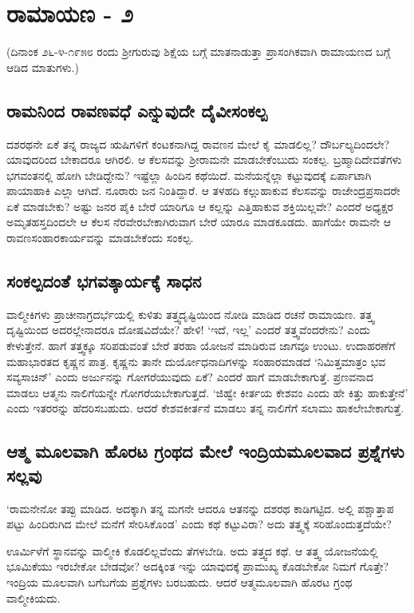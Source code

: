 \chapter{ರಾಮಾಯಣ - ೨}

(ದಿನಾಂಕ ೨೬-೪-೧೯೫೮ ರಂದು ಶ್ರೀಗುರುವು ಶಿಕ್ಷೆಯ ಬಗ್ಗೆ ಮಾತನಾಡುತ್ತಾ ಪ್ರಾಸಂಗಿಕವಾಗಿ ರಾಮಾಯಣದ ಬಗ್ಗೆ ಆಡಿದ ಮಾತುಗಳು.)

\section*{ರಾಮನಿಂದ ರಾವಣವಧೆ ಎನ್ನುವುದೇ ದೈವೀಸಂಕಲ್ಪ}

ದಶರಥನೇ ಏಕೆ ತನ್ನ ರಾಜ್ಯದ ಋಷಿಗಳಿಗೆ ಕಂಟಕನಾಗಿದ್ದ ರಾವಣನ ಮೇಲೆ ಕೈ ಮಾಡಲಿಲ್ಲ? ದೌರ್ಬಲ್ಯದಿಂದಲೇ? ಯಾವುದರಿಂದ ಬೇಕಾದರೂ ಆಗಿರಲಿ. ಆ ಕೆಲಸವನ್ನು  ಶ್ರೀರಾಮನೇ ಮಾಡಬೇಕೆಂಬುದು ಸಂಕಲ್ಪ. ಬ್ರಹ್ಮಾದಿದೇವತೆಗಳು ಭಗವಂತನಲ್ಲಿ ಹೋಗಿ ಬೇಡಿದ್ದೇನು? ಇಷ್ಟೆಲ್ಲಾ ಹಿಂದಿನ ಕಥೆಯಿದೆ. ಮನೆಯನ್ನೆಲ್ಲಾ ಕಟ್ಟುವುದಕ್ಕೆ ಏರ್ಪಾಟಾಗಿ ಪಾಯಾಹಾಕಿ ಎಲ್ಲಾ ಆಗಿದೆ. ನೂರಾರು ಜನ ನಿಂತಿದ್ದಾರೆ. ಆ ತಳಹದಿ ಕಲ್ಲುಹಾಕುವ ಕೆಲಸವನ್ನು ರಾಜೇಂದ್ರಪ್ರಸಾದರೇ ಏಕೆ ಮಾಡಬೇಕು? ಅಷ್ಟು ಜನರ ಪೈಕಿ ಬೇರೆ ಯಾರಿಗೂ ಆ ಕಲ್ಲನ್ನು ಎತ್ತಿಹಾಕುವ ಶಕ್ತಿಯಿಲ್ಲವೇ? ಎಂದರೆ ಅಧ್ಯಕ್ಷರ ಅಮೃತಹಸ್ತದಿಂದಲೇ ಆ ಕೆಲಸ ನೆರವೇರಬೇಕಾಗಿರುವಾಗ ಬೇರೆ ಯಾರೂ ಮಾಡಕೂಡದು. ಹಾಗೆಯೇ ರಾಮನೇ ಆ ರಾವಣಸಂಹಾರಕಾರ್ಯವನ್ನು ಮಾಡಬೇಕೆಂದು ಸಂಕಲ್ಪ.

\section*{ಸಂಕಲ್ಪದಂತೆ ಭಗವತ್ಕಾರ್ಯಕ್ಕೆ ಸಾಧನ}

ವಾಲ್ಮೀಕಿಗಳು ಪ್ರಾಚೀನಾಗ್ರದರ್ಭೆಯಲ್ಲಿ ಕುಳಿತು ತತ್ತ್ವದೃಷ್ಟಿಯಿಂದ ನೋಡಿ ಮಾಡಿದ ರಚನೆ ರಾಮಾಯಣ. ತತ್ತ್ವ ದೃಷ್ಟಿಯಿಂದ ಅದರಲ್ಲೇನಾದರೂ ದೋಷವಿದೆಯೇ? ಹೇಳಿ! `ಇದೆ, ಇಲ್ಲ' ಎಂದರೆ ತತ್ತ್ವವೆಂದರೇನು? ಎಂದು ಕೇಳುತ್ತೇನೆ. ಹಾಗೆ ತತ್ತ್ವಕ್ಕೂ ಸರಿಪಡುವಂತೆ ಬೇರೆ ತರಹಾ ಯೋಜನೆ ಮಾಡಿರುವ ಜಾಗವೂ ಉಂಟು. ಉದಾಹರಣೆಗೆ ಮಹಾಭಾರತದ ಕೃಷ್ಣನ ಪಾತ್ರ. ಕೃಷ್ಣನು ತಾನೇ ದುರ್ಯೋಧನಾದಿಗಳನ್ನು ಸಂಹಾರಮಾಡದೆ `ನಿಮಿತ್ತಮಾತ್ರಂ ಭವ ಸವ್ಯಸಾಚಿನ್' ಎಂದು ಅರ್ಜುನನ್ನು ಗೋಗರೆಯುವುದು ಏಕೆ? ಎಂದರೆ ಹಾಗೆ ಮಾಡಬೇಕಾಗುತ್ತೆ. ಪ್ರಣವನಾದ ಮಾಡಲು ಆತ್ಮನು ನಾಲಿಗೆಯನ್ನೇ ಗೋಗರೆಯಬೇಕಾಗುತ್ತದೆ. `ಜಿಹ್ವೇ ಕೀರ್ತಯ ಕೇಶವಂ ಎಂದು ಹೇ ಕಿತ್ತು ಹಾಕುತ್ತೇನೆ' ಎಂದು ಇತರರನ್ನು ಹೆದರಿಸಬಹುದು. ಆದರೆ ಕೇಶವಕೀರ್ತನೆ ಮಾಡಲು ತನ್ನ ನಾಲಿಗೆಗೆ ಸಲಾಮು ಹಾಕಲೇಬೇಕಾಗುತ್ತೆ. 

\section*{ಆತ್ಮ ಮೂಲವಾಗಿ ಹೊರಟ ಗ್ರಂಥದ ಮೇಲೆ ಇಂದ್ರಿಯಮೂಲವಾದ ಪ್ರಶ್ನೆಗಳು ಸಲ್ಲವು}

`ರಾಮನೇನೋ ತಪ್ಪು ಮಾಡಿದ. ಅದಕ್ಕಾಗಿ ತನ್ನ ಮಗನೇ ಆದರೂ ಆತನನ್ನು ದಶರಥ ಕಾಡಿಗಟ್ಟಿದ. ಅಲ್ಲಿ ಪಶ್ಚಾತ್ತಾಪ ಪಟ್ಟು ಹಿಂದಿರುಗಿದ ಮೇಲೆ ಮನೆಗೆ ಸೇರಿಸಿಕೊಂಡ' ಎಂದು ಕಥೆ ಕಟ್ಟುವಿರಾ? ಅದು ತತ್ತ್ವಕ್ಕೆ ಸರಿಹೊಂದುತ್ತದೆಯೇ?

ಊರ್ಮಿಳೆಗೆ ಸ್ಥಾನವನ್ನು ವಾಲ್ಮೀಕಿ ಕೊಡಲಿಲ್ಲವೆಂದು ತೆಗಳಬೇಡಿ. ಅದು ತತ್ತ್ವದ ಕಥೆ. ಆ ತತ್ತ್ವ ಯೋಜನೆಯಲ್ಲಿ ಭೂಮಿಕೆಯು ಇರಬೇಕೋ ಬೇಡವೋ? ಅದಕ್ಕಿಂತ ಇನ್ನು ಯಾವುದಕ್ಕೆ ಪ್ರಾಮುಖ್ಯ ಕೊಡಬೇಕೋ ನಿಮಗೆ ಗೊತ್ತೇ? ಇಂದ್ರಿಯ ಮೂಲವಾಗಿ ಬಗೆಬಗೆಯ ಪ್ರಶ್ನೆಗಳು ಬರಬಹುದು. ಆದರೆ ಆತ್ಮಮೂಲವಾಗಿ ಹೊರಟ ಗ್ರಂಥ ವಾಲ್ಮೀಕಿಯದು.

